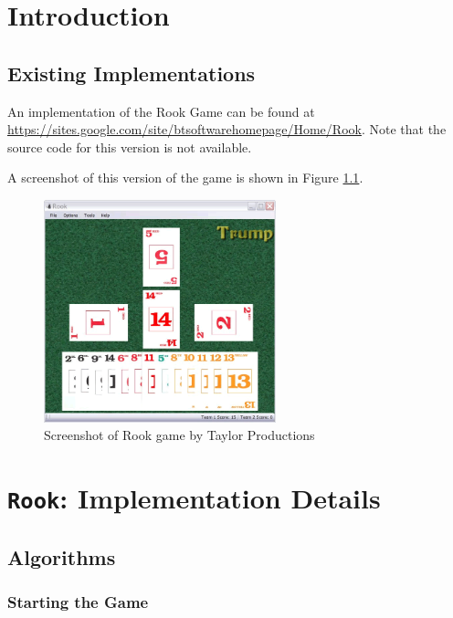 \documentclass[12pt]{report}
\begin{document}
\tableofcontents

\chapter{Introduction}

\section{Existing Implementations}

An implementation of the Rook Game can be found at \url{https://sites.google.com/site/btsoftwarehomepage/Home/Rook}. Note that the source code for this version is not available.

A screenshot of this version of the game is shown in Figure \ref{fig:taylorproductionsrook}.

\begin{figure}[ht]
\caption{Screenshot of Rook game by Taylor Productions}
\label{fig:taylorproductionsrook}
\begin{center}
\includegraphics[width=0.6\textwidth]{images/TaylorProductionsRook}
\end{center}
\end{figure}

\chapter{\texttt{Rook}: Implementation Details}

\section{Algorithms}

\subsection{Starting the Game}
\end{document}
